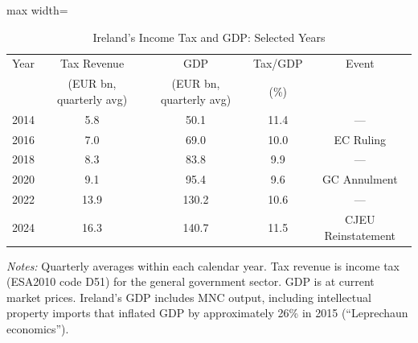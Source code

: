 \begin{table}[H]
\centering
\caption{Ireland's Income Tax and GDP: Selected Years}
\label{tab:decomp}
\begin{threeparttable}
\begin{adjustbox}{max width=\textwidth}
\begin{tabular}{lcccc}
\toprule
Year & Tax Revenue & GDP & Tax/GDP & Event \\
 & (EUR bn, quarterly avg) & (EUR bn, quarterly avg) & (\%) & \\
\midrule
    2014 & 5.8 & 50.1 & 11.4 & --- \\
    2016 & 7.0 & 69.0 & 10.0 & EC Ruling \\
    2018 & 8.3 & 83.8 & 9.9 & --- \\
    2020 & 9.1 & 95.4 & 9.6 & GC Annulment \\
    2022 & 13.9 & 130.2 & 10.6 & --- \\
    2024 & 16.3 & 140.7 & 11.5 & CJEU Reinstatement \\
\bottomrule
\end{tabular}
\end{adjustbox}
\end{threeparttable}
\vspace{0.3em}
\begin{minipage}{\textwidth}
\small
\textit{Notes:} Quarterly averages within each calendar year. Tax revenue is income tax (ESA2010 code D51) for the general government sector. GDP is at current market prices. Ireland's GDP includes MNC output, including intellectual property imports that inflated GDP by approximately 26\% in 2015 (``Leprechaun economics'').
\end{minipage}
\end{table}
